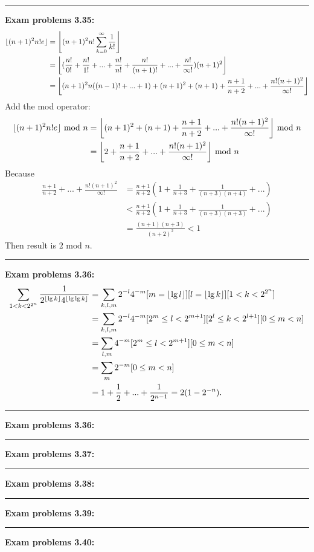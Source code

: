 \documentclass{article}
\DeclarePairedDelimiter\floor{\lfloor}{\rfloor}
\begin{document}
\noindent\rule{\textwidth}{0.4pt}
\textbf{Exam problems 3.35:}
\begin{align}
\floor{(n+1)^2 n! e} &= \floor*{(n+1)^2 n! \sum_{k=0}^{\infty}\frac{1}{k!} } \\
		     &= \floor*{(\frac{n!}{0!} + \frac{n!}{1!} + ... + \frac{n!}{n!} + \frac{n!}{(n+1)!} + ... + \frac{n!}{\infty!})(n+1)^2}\\
		     &= \floor*{(n+1)^2 n ((n-1)! + ... + 1) + (n+1)^2 + (n+1) + \frac{n+1}{n+2} + ... + \frac{n!(n+1)^2}{\infty!}} \\
\end{align}
Add the mod operator:
\begin{align}
\floor{(n+1)^2 n! e} \text{ mod } n &= \floor*{(n+1)^2 + (n+1) + \frac{n+1}{n+2} + ... + \frac{n!(n+1)^2}{\infty!}} \text{ mod } n \\
				    &= \floor*{2 + \frac{n+1}{n+2} + ... + \frac{n!(n+1)^2}{\infty!}} \text{ mod } n
\end{align}
Because 
\begin{align}
\frac{n+1}{n+2} + ... + \frac{n!(n+1)^2}{\infty!} &= \frac{n+1}{n+2}(1 + \frac{1}{n+3} + \frac{1}{(n+3)(n+4)} + ... ) \\
						  &< \frac{n+1}{n+2}(1 + \frac{1}{n+3} + \frac{1}{(n+3)(n+3)} + ...) \\
						  &= \frac{(n+1)(n+3)}{(n+2)^2} < 1
\end{align}
Then result is $2 \text{ mod } n$.

\noindent\rule{\textwidth}{0.4pt}
\textbf{Exam problems 3.36:}
\begin{align}
\sum_{1 < k < 2^{2^n}}{\frac{1}{2^{\floor{\lg k}}4^{\floor{\lg \lg k}}}} &= \sum_{k,l,m} 2^{-l} 4^{-m} [m = \floor{\lg l}][l = \floor{\lg k}][1 < k < 2^{2^n}] \\
									 &= \sum_{k,l,m} 2^{-l} 4^{-m} [2^m \le l < 2^{m+1}][2^l \le k < 2^{l+1}][0 \le m < n] \\
									 &= \sum_{l,m} 4^{-m}[2^m \le l < 2^{m+1}][0 \le m < n] \\
									 &= \sum_{m} 2^{-m}[0 \le m < n] \\
									 &= 1 + \frac{1}{2} + ... + \frac{1}{2^{n-1}} = 2(1 - 2^{-n}).
\end{align}


\noindent\rule{\textwidth}{0.4pt}
\textbf{Exam problems 3.36:}

\noindent\rule{\textwidth}{0.4pt}
\textbf{Exam problems 3.37:}

\noindent\rule{\textwidth}{0.4pt}
\textbf{Exam problems 3.38:}

\noindent\rule{\textwidth}{0.4pt}
\textbf{Exam problems 3.39:}

\noindent\rule{\textwidth}{0.4pt}
\textbf{Exam problems 3.40:}
\end{document}
